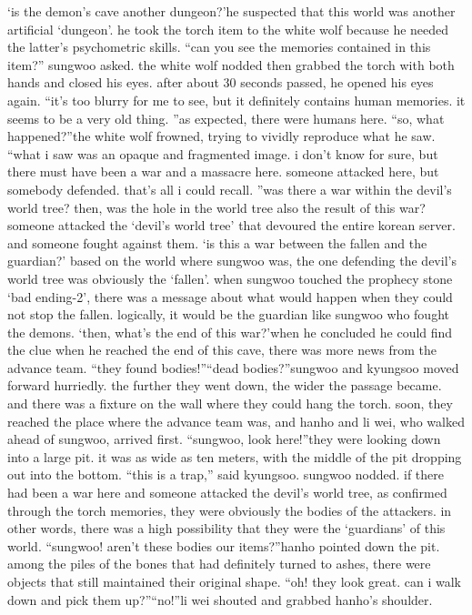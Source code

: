 ‘is the demon’s cave another dungeon?’he suspected that this world was another artificial ‘dungeon’.
he took the torch item to the white wolf because he needed the latter’s psychometric skills.
“can you see the memories contained in this item?” sungwoo asked.
the white wolf nodded then grabbed the torch with both hands and closed his eyes.
after about 30 seconds passed, he opened his eyes again.
“it’s too blurry for me to see, but it definitely contains human memories.
 it seems to be a very old thing.
”as expected, there were humans here.
“so, what happened?”the white wolf frowned, trying to vividly reproduce what he saw.
“what i saw was an opaque and fragmented image.
 i don’t know for sure, but there must have been a war and a massacre here.
 someone attacked here, but somebody defended.
 that’s all i could recall.
”was there a war within the devil’s world tree? then, was the hole in the world tree also the result of this war?someone attacked the ‘devil’s world tree’ that devoured the entire korean server.
 and someone fought against them.
‘is this a war between the fallen and the guardian?’
based on the world where sungwoo was, the one defending the devil’s world tree was obviously the ‘fallen’.
 when sungwoo touched the prophecy stone ‘bad ending-2’, there was a message about what would happen when they could not stop the fallen.
logically, it would be the guardian like sungwoo who fought the demons.
‘then, what’s the end of this war?’when he concluded he could find the clue when he reached the end of this cave, there was more news from the advance team.
“they found bodies!”“dead bodies?”sungwoo and kyungsoo moved forward hurriedly.
 the further they went down, the wider the passage became.
 and there was a fixture on the wall where they could hang the torch.
soon, they reached the place where the advance team was, and hanho and li wei, who walked ahead of sungwoo, arrived first.
“sungwoo, look here!”they were looking down into a large pit.
 it was as wide as ten meters, with the middle of the pit dropping out into the bottom.
“this is a trap,” said kyungsoo.
sungwoo nodded.
 if there had been a war here and someone attacked the devil’s world tree, as confirmed through the torch memories, they were obviously the bodies of the attackers.
in other words, there was a high possibility that they were the ‘guardians’ of this world.
“sungwoo! aren’t these bodies our items?”hanho pointed down the pit.
 among the piles of the bones that had definitely turned to ashes, there were objects that still maintained their original shape.
“oh! they look great.
 can i walk down and pick them up?”“no!”li wei shouted and grabbed hanho’s shoulder.
